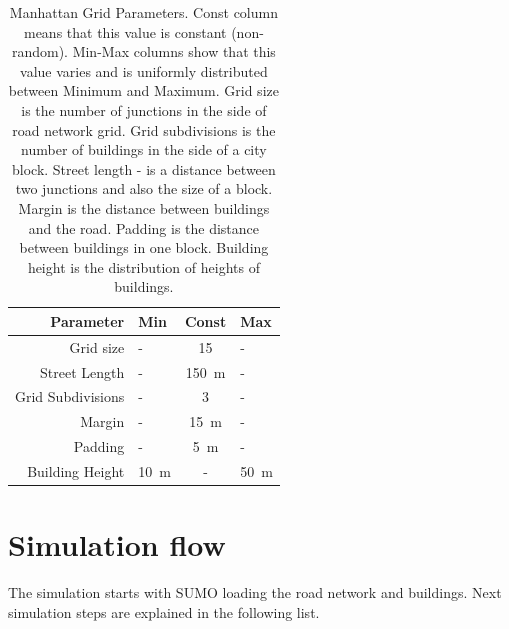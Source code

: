 \documentclass[]{nsm-thesis}
\begin{document}
\begin{table}
    \centering
    \begin{tabular}{rlcl}
        \toprule
        Parameter & Min & Const & Max \\
        \midrule
        	Grid size & - & 15 & - \\
        	Street Length & - & \SI{150}{\meter} & - \\
		Grid Subdivisions & - & 3 & - \\
		Margin & - & \SI{15}{\meter} & - \\
		Padding & - & \SI{5}{\meter} & - \\
		Building Height & \SI{10}{\meter} & - & \SI{50}{\meter} \\
        \bottomrule
    \end{tabular}
    \caption{Manhattan Grid Parameters. Const column means that this value is constant (non-random). Min-Max columns show that this value varies and is uniformly distributed between Minimum and Maximum. Grid size is the number of junctions in the side of road network grid. Grid subdivisions is the number of buildings in the side of a city block. Street length - is a distance between two junctions and also the size of a block. Margin is the distance between buildings and the road. Padding is the distance between buildings in one block. Building height is the distribution of heights of buildings. }
    \label{tab:manhattangrid}
\end{table}



\section {Simulation flow}

The simulation starts with SUMO loading the road network and buildings. Next simulation steps are explained in the following list.
\end{document}
